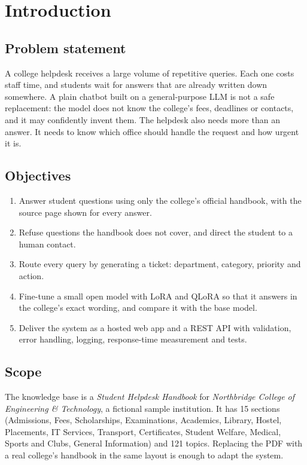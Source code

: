 \documentclass[11pt,a4paper]{report}
\begin{document}
\chapter{Introduction}

\section{Problem statement}
A college helpdesk receives a large volume of repetitive queries. Each one costs staff time, and
students wait for answers that are already written down somewhere. A plain chatbot built on a
general-purpose LLM is not a safe replacement: the model does not know the college's fees,
deadlines or contacts, and it may confidently invent them. The helpdesk also needs more than an
answer. It needs to know which office should handle the request and how urgent it is.

\section{Objectives}
\begin{enumerate}
  \item Answer student questions using only the college's official handbook, with the source page
        shown for every answer.
  \item Refuse questions the handbook does not cover, and direct the student to a human contact.
  \item Route every query by generating a ticket: department, category, priority and action.
  \item Fine-tune a small open model with LoRA and QLoRA so that it answers in the college's exact
        wording, and compare it with the base model.
  \item Deliver the system as a hosted web app and a REST API with validation, error handling,
        logging, response-time measurement and tests.
\end{enumerate}

\section{Scope}
The knowledge base is a \emph{Student Helpdesk Handbook} for \emph{Northbridge College of
Engineering \& Technology}, a fictional sample institution. It has 15 sections (Admissions, Fees,
Scholarships, Examinations, Academics, Library, Hostel, Placements, IT Services, Transport,
Certificates, Student Welfare, Medical, Sports and Clubs, General Information) and 121 topics.
Replacing the PDF with a real college's handbook in the same layout is enough to adapt the system.
\end{document}
